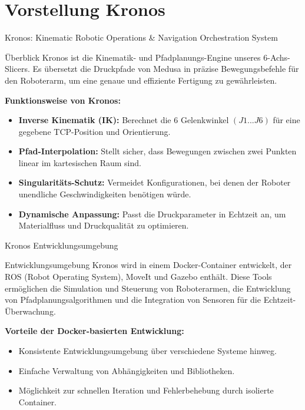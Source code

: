 \section{Vorstellung Kronos}

\begin{frame}{Kronos: Kinematic Robotic Operations \& Navigation Orchestration System}
    \begin{alertblock}{Überblick}
        Kronos ist die Kinematik- und Pfadplanungs-Engine unseres 6-Achs-Slicers. 
        Es übersetzt die Druckpfade von Medusa in präzise Bewegungsbefehle für den Roboterarm, 
        um eine genaue und effiziente Fertigung zu gewährleisten.
    \end{alertblock}

    \vspace{0.25cm}
    \textbf{Funktionsweise von Kronos:}
    \begin{itemize}
        \item \textbf{Inverse Kinematik (IK):} Berechnet die 6 Gelenkwinkel $(J1...J6)$ für eine gegebene TCP-Position und Orientierung.
        \item \textbf{Pfad-Interpolation:} Stellt sicher, dass Bewegungen zwischen zwei Punkten linear im kartesischen Raum sind.
        \item \textbf{Singularitäts-Schutz:} Vermeidet Konfigurationen, bei denen der Roboter unendliche Geschwindigkeiten benötigen würde.
        \item \textbf{Dynamische Anpassung:} Passt die Druckparameter in Echtzeit an, um Materialfluss und Druckqualität zu optimieren.
    \end{itemize}
\end{frame}

\begin{frame}{Kronos Entwicklungsumgebung} %
    \begin{alertblock}{Entwicklungsumgebung}
        Kronos wird in einem Docker-Container entwickelt, der ROS (Robot Operating System), MoveIt und Gazebo enthält. 
        Diese Tools ermöglichen die Simulation und Steuerung von Roboterarmen, die Entwicklung von Pfadplanungsalgorithmen und die Integration von Sensoren für die Echtzeit-Überwachung.
    \end{alertblock}

    \vspace{0.5cm}
    \textbf{Vorteile der Docker-basierten Entwicklung:}
    \begin{itemize}
        \item Konsistente Entwicklungsumgebung über verschiedene Systeme hinweg.
        \item Einfache Verwaltung von Abhängigkeiten und Bibliotheken.
        \item Möglichkeit zur schnellen Iteration und Fehlerbehebung durch isolierte Container.
    \end{itemize}
\end{frame}
